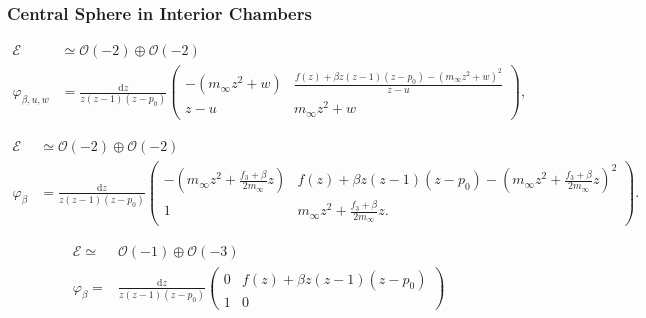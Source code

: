 \documentclass[10pt,a4paper]{amsart}
\newcommand{\cE}{{\mathcal E}}
\newcommand{\cO}{\ensuremath{\mathcal O}}
\newcommand{\de}{\mathrm{d}}
\begin{document}
\subsubsection{Central Sphere in Interior Chambers} \label{sec:centralsphereinint}

 \begin{align}\label{eq:bigstrata}
 \cE &\simeq \cO(-2) \oplus \cO(-2)  \\ \nonumber
 \varphi_{\beta, u, w} &= \frac{\de z}{z(z-1)(z-p_0)}\begin{pmatrix}  -(m_\infty z^2 + w) & \frac{f(z) + \beta z (z-1)(z-p_0) - (m_\infty z^2 + w)^2}{z-u} \\  z-u & m_\infty z^2 + w \end{pmatrix},
\end{align}

\begin{align} \label{eq:extrapoint}
  \cE &\simeq \cO(-2) \oplus \cO(-2)  \\ \nonumber
 \varphi_\beta &=  \frac{\de z}{z(z-1)(z-p_0)}\begin{pmatrix} -(m_\infty z^2 +
            \frac{f_3 + \beta}{2 m_\infty} z) & f(z) + \beta z(z-1)(z-p_0) 
            -\left(m_\infty z^2 +
            \frac{f_3 + \beta}{2 m_\infty} z\right)^2 \\ 1 & m_\infty z^2 +
            \frac{f_3 + \beta}{2 m_\infty} z.
           \end{pmatrix}.
\end{align}

\begin{align}\label{eq:smallstrata}
 \cE \simeq&  \cO(-1) \oplus \cO(-3) \\ \nonumber
 \varphi_\beta  =& \frac{\de z}{z(z-1)(z-p_0)}\begin{pmatrix} 0 & f(z) + \beta z (z-1)(z-p_0) \\ 1 & 0 \end{pmatrix} 
\end{align}
\end{document}
